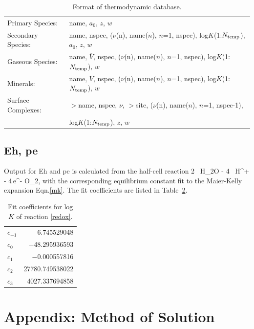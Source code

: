 \begin{table}[h]\centering
\caption{Format of thermodynamic database.}\label{tdatabase}
\vspace{3mm}
\begin{tabular}{ll}
\hline
Primary Species: & name, $a_0$, $z$, $w$\\
Secondary Species: & name, nspec, ($\nu$(n), name($n$), $n$=1, nspec), log$K$(1:$N_{\rm temp}$), $a_0$, $z$, $w$\\
Gaseous Species: & name, $\overline V$, nspec, ($\nu$(n), name($n$), $n$=1, nspec), log$K$(1:$N_{\rm temp}$), $w$ \\
Minerals: & name, $\overline V$, nspec, ($\nu$(n), name($n$), $n$=1, nspec), log$K$(1:$N_{\rm temp}$), $w$\\
Surface Complexes: & $>$name, nspec, $\nu$, $>$site, 
($\nu$(n), name($n$), $n$=1, nspec-1), \\
&\hspace{3in} log$K$(1:$N_{\rm temp}$), $z$, $w$\\
\hline
\end{tabular}
\end{table}

\subsection{Eh, pe}

Output for Eh and pe is calculated from the half-cell reaction
\EQ\label{redox}
\rm 2 \, H_2O - 4 \, H^+ - 4\,e^- \arrows \rm O_2,
\EN
with the corresponding equilibrium constant fit to the Maier-Kelly expansion Eqn.\eqref{mk}. The fit coefficients are listed in Table~\ref{tmkfit}.

\begin{table}[H]\centering
\caption{Fit coefficients for log $K$ of reaction \ref{redox}.}
\label{tmkfit}
\vspace{3mm}
\begin{tabular}{lr}
\toprule
$c_{-1}$ & 6.745529048\\
$c_0$ & $-$48.295936593\\
$c_1$ & $-$0.000557816\\
$c_2$ & 27780.749538022\\
$c_3$ & 4027.337694858\\
\bottomrule
\end{tabular}
\end{table}

\section{Appendix: Method of Solution}

